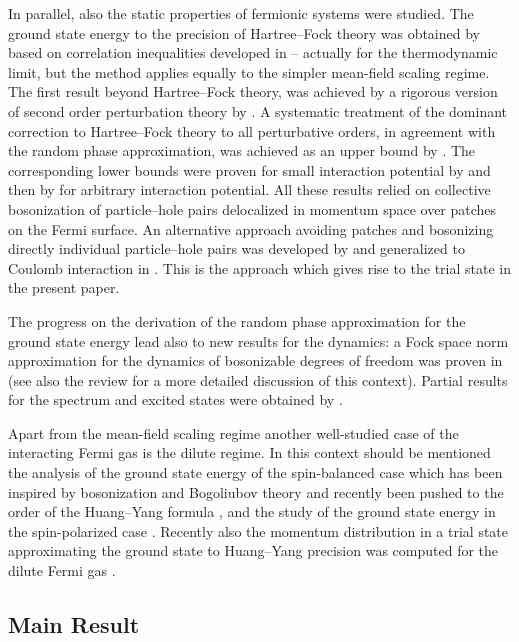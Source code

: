 \documentclass[12pt,a4paper]{article}
\numberwithin{equation}{section}
\newcommand{\1}{\mathbb{I}}
\theoremstyle{plain}
\theoremstyle{definition}
\theoremstyle{remark}
\theoremstyle{plain}
\theoremstyle{definition}
\theoremstyle{remark}
\begin{document}
In parallel, also the static properties of fermionic systems were studied. The ground state energy to the precision of Hartree--Fock theory was obtained by \cite{GS94} based on correlation inequalities developed in \cite{Bac92,Bac93} -- actually for the thermodynamic limit, but the method applies equally to the simpler mean-field scaling regime. The first result beyond Hartree--Fock theory, was achieved by a rigorous version of second order perturbation theory by \cite{HPR20}. A systematic treatment of the dominant correction to Hartree--Fock theory to all perturbative orders, in agreement with the random phase approximation, was achieved as an upper bound by \cite{BNP+20}. The corresponding lower bounds were proven for small interaction potential by \cite{BNP+21} and then by \cite{BPSS23} for arbitrary interaction potential. All these results relied on collective bosonization of particle--hole pairs delocalized in momentum space over patches on the Fermi surface. An alternative approach avoiding patches and bosonizing directly individual particle--hole pairs was developed by \cite{CHN23,CHN23a} and generalized to Coulomb interaction in \cite{CHN24}. This is the approach which gives rise to the trial state in the present paper.

The progress on the derivation of the random phase approximation for the ground state energy lead also to new results for the dynamics: a Fock space norm approximation for the dynamics of bosonizable degrees of freedom was proven in \cite{BNP+22} (see also the review \cite{Ben22} for a more detailed discussion of this context). Partial results for the spectrum and excited states were obtained by \cite{Ben21,CHN22}.

Apart from the mean-field scaling regime another well-studied case of the interacting Fermi gas is the dilute regime. In this context should be mentioned the analysis of the ground state energy of the spin-balanced case \cite{Gia23,Gia24} which has been inspired by bosonization and Bogoliubov theory \cite{FGHP21a,Gia23b} and recently been pushed to the order of the Huang--Yang formula \cite{GHNS24,GHNS25}, and the study of the ground state energy in the spin-polarized case \cite{LS24,LS24a,LS24b,LS24c}. Recently also the momentum distribution in a trial state approximating the ground state to Huang--Yang precision was computed for the dilute Fermi gas \cite{BGLL26}.

\subsection{Main Result}
\label{subsec:mainresult}
\end{document}
